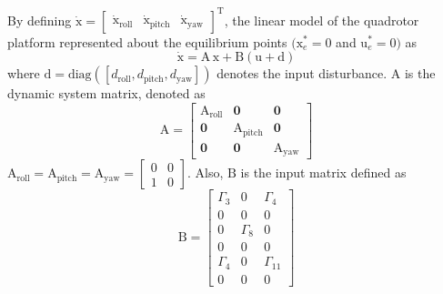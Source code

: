 \documentclass[3p]{elsarticle}
\begin{document}
\noindent By defining $\boldsymbol{\dot{\mathrm{x}}} = \begin{bmatrix}
    \boldsymbol{{\mathrm{\dot x_{\text{roll}}}}}&
    \boldsymbol{{\mathrm{\dot x_{\text{pitch}}}}}&
    \boldsymbol{{\mathrm{\dot x_{\text{yaw}}}}}
\end{bmatrix}^{\mathrm{T}}$, the linear model of the quadrotor platform represented about the equilibrium points $(\boldsymbol{{\mathrm{x}}}_e^*\!=\!0$ and $\boldsymbol{{\mathrm{u}}}_e^*\!=\!0)$ as
\begin{equation}\label{eq:linear}
    \boldsymbol{\dot{\mathrm{x}}} = \boldsymbol{\mathrm{A\,x}} + 
    \boldsymbol{\mathrm{B}}
    \left(\boldsymbol{\mathrm{u}} + \boldsymbol{\mathrm{d}}\right)
\end{equation}
where $\boldsymbol{\mathrm{d}} = \text{diag}([d_{\text{roll}}, d_{\text{pitch}}, d_{\text{yaw}}])$ denotes the input disturbance.
$\boldsymbol{\mathrm{A}}$ is the dynamic system matrix, denoted as
\begin{equation}
    \boldsymbol{\mathrm{A}} = \begin{bmatrix}
        \boldsymbol{{\mathrm{A_{\text{roll}}}}} & \boldsymbol{0} & \boldsymbol{0}\\
        \boldsymbol{0} & \boldsymbol{{\mathrm{A_{\text{pitch}}}}} & \boldsymbol{0} \\
        \boldsymbol{0} & \boldsymbol{0} & \boldsymbol{{\mathrm{A_{\text{yaw}}}}}
    \end{bmatrix}
\end{equation}
$
        \boldsymbol{\mathrm{A}}_{\text{roll}}  =\boldsymbol{\mathrm{A}}_{\text{pitch}}  = \boldsymbol{\mathrm{A}}_{\text{yaw}}  = \begin{bmatrix}
            0 & 0\\
            1 & 0
        \end{bmatrix}
$. Also, $\boldsymbol{\mathrm{B}}$ is the input matrix defined as
\begin{equation}
    \boldsymbol{\mathrm{B}} = 
     \begin{bmatrix}
        \Gamma_3 & 0 & \Gamma_4\\
        0 & 0 & 0 \\
        0 & \Gamma_8 & 0 \\
        0 & 0 & 0 \\
        \Gamma_4 & 0 & \Gamma_{11} \\
        0 & 0 & 0
    \end{bmatrix}
\end{equation}
\end{document}
